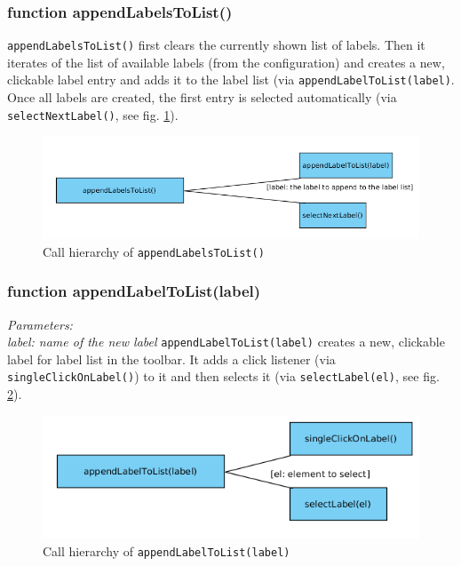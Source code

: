 \subsubsection{function appendLabelsToList()}
\texttt{appendLabelsToList()} first clears the currently shown list of labels. Then it iterates of the list of available labels (from the configuration) and creates a new, clickable label entry and adds it to the label list (via \texttt{appendLabelToList(label)}. Once all labels are created, the first entry is selected automatically (via \texttt{selectNextLabel()}, see fig. \ref{figB_appendLabels}).

\begin{figure}[H]
	\begin{center}
		\includegraphics[scale=0.5]{img/ch_appendLabels.png}
		\caption{Call hierarchy of \texttt{appendLabelsToList()}}
		\label{figB_appendLabels}
	\end{center}
\end{figure}


\subsubsection{function appendLabelToList(label)}
\emph{Parameters:\\
	label: name of the new label
}
\texttt{appendLabelToList(label)} creates a new, clickable label for label list in the toolbar. It adds a click listener (via \texttt{singleClickOnLabel()}) to it and then selects it (via \texttt{selectLabel(el)}, see fig. \ref{figB_appendLabel}).

\begin{figure}[H]
	\begin{center}
		\includegraphics[scale=0.5]{img/ch_appendLabel.png}
		\caption{Call hierarchy of \texttt{appendLabelToList(label)}}
		\label{figB_appendLabel}
	\end{center}
\end{figure}


